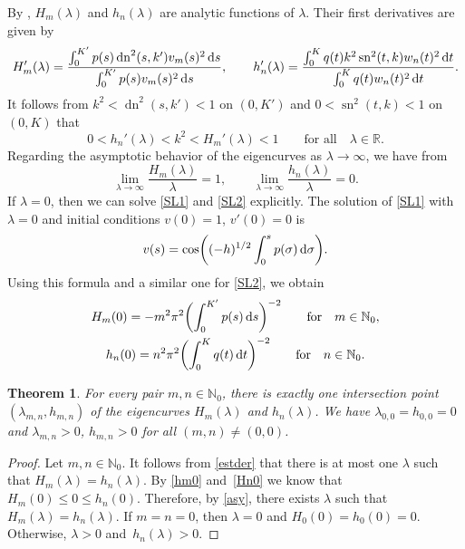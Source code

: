 \documentclass[10pt,a4paper]{amsart}
\newtheorem{thm}{Theorem}[section]
\newcommand{\R}{\mathbb{R}}
\newcommand{\N}{\mathbb{N}}
\DeclareMathOperator{\sn}{sn}
\DeclareMathOperator{\dn}{dn}
\numberwithin{equation}{section}
\begin{document}
By \cite[Theorem 2.1]{BV}, $H_m(\lambda)$ and $h_n(\lambda)$ are analytic functions of $\lambda$. Their first derivatives \cite[formula~(2.5)]{BV} are given by
\begin{gather*}
H_m'(\lambda)=\frac{\int_0^{K'} p(s)\dn^2(s,k') v_m(s)^2\,{\rm d}s}{\int_0^{K'} p(s)v_m(s)^2\,{\rm d}s},\qquad
h_n'(\lambda)=\frac{\int_0^{K} q(t)k^2\sn^2(t,k) w_n(t)^2\,{\rm d}t}{\int_0^{K} q(t)w_n(t)^2\,{\rm d}t}.
\end{gather*}
It follows from $k^2<\dn^2(s,k')<1$ on $(0,K')$ and $0<\sn^2(t,k)<1$ on $(0,K)$ that
\begin{equation}\label{estder}
0<h_n'(\lambda)<k^2<H_m'(\lambda)<1\qquad \text{for all} \quad \lambda\in\R.
\end{equation}
Regarding the asymptotic behavior of the eigencurves as $\lambda\to\infty$, we have from \cite[Theorem 2.2]{BV}%
\begin{equation}\label{asy}
\lim_{\lambda\to\infty} \frac{H_m(\lambda)}{\lambda}=1,\qquad \lim_{\lambda\to\infty} \frac{h_n(\lambda)}{\lambda}=0.
\end{equation}
If $\lambda=0$, then we can solve \eqref{SL1} and \eqref{SL2} explicitly.
The solution of \eqref{SL1} with $\lambda=0$ and initial conditions $v(0)=1$, $v'(0)=0$ is
\[ v(s)=\cos\biggl((-h)^{1/2}\int_0^s p(\sigma)\,{\rm d}\sigma\biggr).\]
Using this formula and a similar one for \eqref{SL2}, we obtain
\begin{gather}\label{hm0}
 H_m(0)=-m^2\pi^2 \biggl(\int_0^{K'} p(s)\,{\rm d}s\biggr)^{-2} \qquad \text{for}\quad m\in\N_0,\\
h_n(0)=n^2\pi^2 \biggl(\int_0^{K} q(t)\,{\rm d}t\biggr)^{-2} \qquad \text{for} \quad n\in\N_0.\label{Hn0}
\end{gather}


\begin{thm}\label{t1}
For every pair $m,n\in\N_0$, there is exactly one intersection point $(\lambda_{m,n},h_{m,n})$ of the
eigencurves $H_m(\lambda)$ and $h_n(\lambda)$. We have $\lambda_{0,0}=h_{0,0}=0$ and $\lambda_{m,n}>0$, $h_{m,n}>0$ for all $(m,n)\ne (0,0)$.
\end{thm}

\begin{proof}
Let $m,n\in\N_0$. It follows from \eqref{estder} that there is at most one $\lambda$ such that ${H_m(\lambda)\!=\!h_n(\lambda)}$.
By \eqref{hm0} and~\eqref{Hn0} we know that $H_m(0)\le 0\le h_n(0)$. Therefore, by \eqref{asy}, there exists $\lambda$ such that $H_m(\lambda)=h_n(\lambda)$. If $m=n=0$, then $\lambda=0$ and $H_0(0)=h_0(0)=0$. Otherwise, $\lambda>0$ and~$h_n(\lambda)>0$.
\end{proof}
\end{document}

